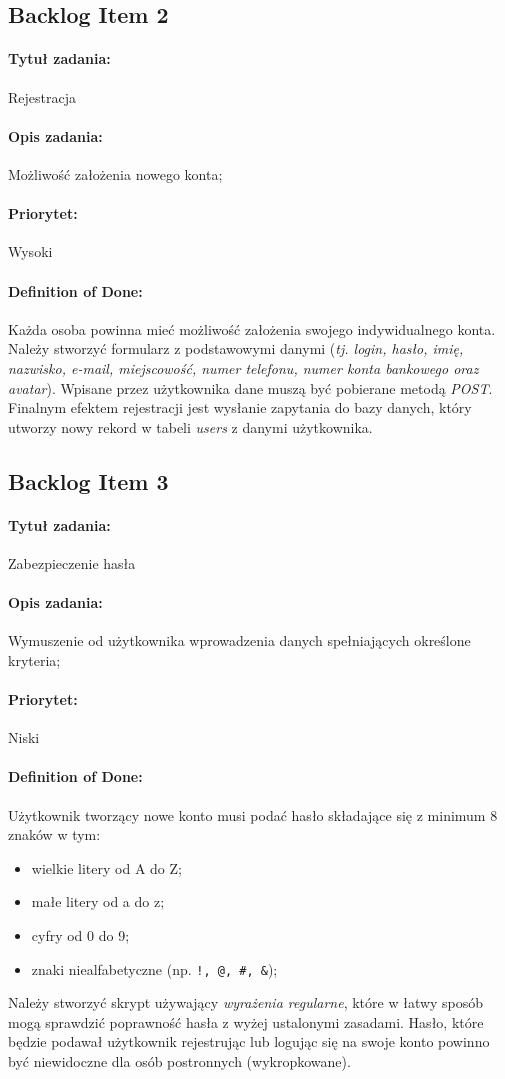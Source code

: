 \documentclass[a4paper]{article}
\begin{document}
	\subsection{Backlog Item 2}
	\paragraph{Tytuł zadania:} Rejestracja
	\paragraph{Opis zadania:} Możliwość założenia nowego konta;
	\paragraph{Priorytet:} Wysoki
	\paragraph{Definition of Done:} Każda osoba powinna mieć możliwość założenia swojego indywidualnego konta. Należy stworzyć formularz z podstawowymi danymi (\emph{tj. login, hasło, imię, nazwisko, e-mail, miejscowość, numer telefonu, numer konta bankowego oraz avatar}). Wpisane przez użytkownika dane muszą być pobierane metodą \emph{POST}. Finalnym efektem rejestracji jest wysłanie zapytania do bazy danych, który utworzy nowy rekord w tabeli \emph{users} z danymi użytkownika.
	
	\subsection{Backlog Item 3}
	\paragraph{Tytuł zadania:} Zabezpieczenie hasła
	\paragraph{Opis zadania:} Wymuszenie od użytkownika wprowadzenia danych spełniających określone kryteria;
	\paragraph{Priorytet:} Niski
	\paragraph{Definition of Done:} Użytkownik tworzący nowe konto musi podać hasło składające się z minimum 8 znaków w tym:
	\begin{itemize}
		\item wielkie litery od A do Z;
		\item małe litery od a do z;
		\item cyfry od 0 do 9;
		\item znaki niealfabetyczne (np. \verb|!, @, #, &|);
	\end{itemize}
	Należy stworzyć skrypt używający \emph{wyrażenia regularne}, które w łatwy sposób mogą sprawdzić poprawność hasła z wyżej ustalonymi zasadami. Hasło, które będzie podawał użytkownik rejestrując lub logując się na swoje konto powinno być niewidoczne dla osób postronnych (wykropkowane).
\end{document}
